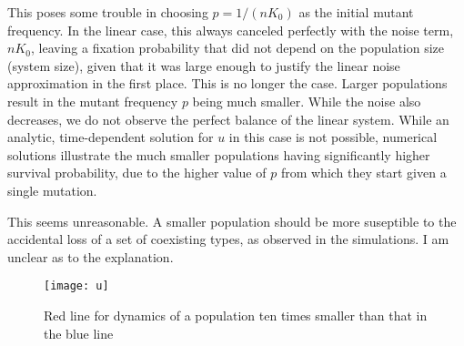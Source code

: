 \documentclass[letterpaper,10pt]{article}
\begin{document}
This poses some trouble in choosing $p = 1/(nK_0)$ as the initial mutant frequency.  In the linear case, this always canceled perfectly with the noise term, $nK_0$, leaving a fixation probability that did not depend on the population size (system size), given that it was large enough to justify the linear noise approximation in the first place.  This is no longer the case.  Larger populations result in the mutant frequency $p$ being much smaller.  While the noise also decreases, we do not observe the perfect balance of the linear system.  While an analytic, time-dependent solution for $u$ in this case is not possible, numerical solutions illustrate the much smaller populations having significantly higher survival probability, due to the higher value of $p$ from which they start given a single mutation.  

This seems unreasonable.  A smaller population should be more suseptible to the accidental loss of a set of coexisting types, as observed in the simulations.  I am unclear as to the explanation.  

\begin{figure}[h]
\begin{center}
\texttt{[image: u]}
\end{center}
\caption{Red line for dynamics of a population ten times smaller than that in the blue line}
\label{fig:u}
\end{figure}
\end{document}
